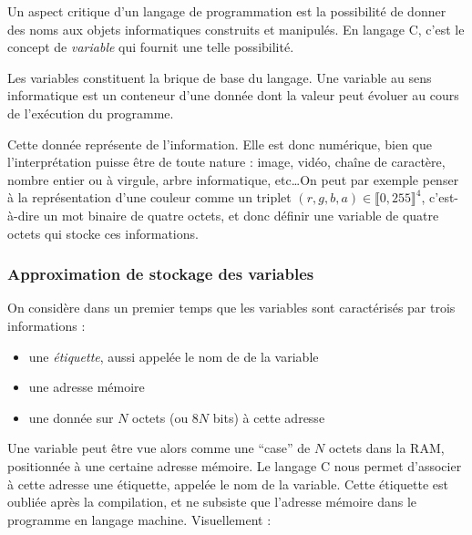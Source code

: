 \documentclass[../../../main.tex]{subfiles}
\begin{document}
Un aspect critique d'un langage de programmation est la possibilité de donner des noms aux objets informatiques construits et manipulés. En langage C, c'est le concept de \textit{variable} qui fournit une telle possibilité.

Les variables constituent la brique de base du langage. Une variable au sens informatique est un conteneur d'une donnée dont la valeur peut évoluer au cours de l'exécution du programme.
 
Cette donnée représente de l'information. Elle est donc numérique, bien que l'interprétation puisse être de toute nature : image, vidéo, chaîne de caractère, nombre entier ou à virgule, arbre informatique, etc\dots On peut par exemple penser à la représentation d'une couleur comme un triplet $(r, g, b, a)\in{\llbracket 0, 255\rrbracket^{4}}$, c'est-à-dire un mot binaire de quatre octets, et donc définir une variable de quatre octets qui stocke ces informations.
 
\subsubsection{Approximation de stockage des variables}
\label{ssub:approximation_de_stockage_des_variables} 
On considère dans un premier temps que les variables sont caractérisés par trois informations :
\begin{itemize}
	\item une \textit{étiquette}, aussi appelée le nom de de la variable
	\item une adresse mémoire
	\item une donnée sur $N$ octets (ou $8N$ bits) à cette adresse
\end{itemize}
Une variable peut être vue alors comme une ``case'' de $N$ octets dans la RAM, positionnée à une certaine adresse mémoire. Le langage C nous permet d'associer à cette adresse une étiquette, appelée le nom de la variable. Cette étiquette est oubliée après la compilation, et ne subsiste que l'adresse mémoire dans le programme en langage machine.\newline
Visuellement :

\begin{minipage}{\textwidth}
	\begin{center}
		
		\label{img:variable}
	\end{center}
\end{minipage}
\end{document}
